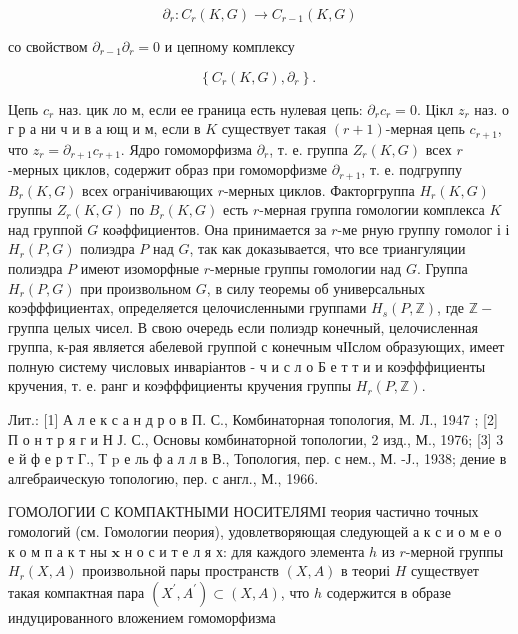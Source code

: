 \documentclass[10pt]{article}
\begin{document}
\[

\partial_{r}: C_{r}(K, G) \longrightarrow C_{r-1}(K, G)

\]



со свойством $\partial_{r-1} \partial_{r}=0$ и цепному комплексу



\[

\left\{C_{r}(K, G), \partial_{r}\right\} \text {. }

\]



Цепь $c_{r}$ наз. цик ло м, если ее граница есть нулевая цепь: $\partial_{r} c_{r}=0$. Цікл $z_{r}$ наз. о г р а ни ч и в а ющ и м, если в $K$ существует такая $(r+1)$-мерная цепь $c_{r+1}$, что $z_{r}=\partial_{r+1} c_{r+1}$. Ядро гомоморфизма $\partial_{r}$, т. е. группа $Z_{r}(K, G)$ всех $r$-мерных циклов, содержит образ при гомоморфизме $\partial_{r+1}$, т. е. подгруппу $B_{r}(K, G)$ всех огранічивающих $r$-мерных циклов. Факторгруппа $H_{r}(K, G)$ группы $Z_{r}(K, G)$ по $B_{r}(K, G)$ есть $r$-мерная группа гомологии комплекса $K$ над группой $G$ коәффициентов. Она принимается за $r$-ме рную группу гомолог і і $H_{r}(P, G)$ полиэдра $P$ над $G$, так как доказывается, что все триангуляции полиэдра $P$ имеют изоморфные $r$-мерные группы гомологии над $G$. Группа $H_{r}(P, G)$ при произвольном $G$, в силу теоремы об универсальных коэфффициентах, определяется целочисленными группами $H_{s}(P, \mathbb{Z})$, где $\mathbb{Z}-$ группа целых чисел. В свою очередь если полиэдр конечный, целочисленная группа, к-рая является абелевой группой с конечным чІІслом образующих, имеет полную систему числовых инваріантов - ч и с л о Б е т т и и коэфффициенты кручения, т. е. ранг и коэфффициенты кручения группы $H_{r}(P, \mathbb{Z})$.



Лит.: [1] А л е к с а н д р о в П. С., Комбинаторная топология, М. Л., 1947 ; [2] П о н т р я г и Н Ј. С., Основы комбинаторной топологии, 2 изд., М., 1976; [3] 3 е й ф е р т Г., Т p е ль ф а л л в В., Топология, пер. с нем., М. -Ј., 1938; дение в алгебраическую топологию, пер. с англ., М., 1966.



ГОМОЛОГИИ С КОМПАКТНЫМИ НОСИТЕЛЯМІ теория частично точных гомологий (см. Гомологии пеория), удовлетворяющая следующей а к с и о м е о к о м п а к т ны $\mathbf{x}$ н о с и т е л я х: для каждого элемента $h$ из $r$-мерной группы $H_{r}(X, A)$ произвольной пары пространств $(X, A)$ в теориі $H$ существует такая компактная пара $\left(X^{\prime}, A^{\prime}\right) \subset(X, A)$, что $h$ содержится в образе индуцированного вложением гомоморфизма
\end{document}

